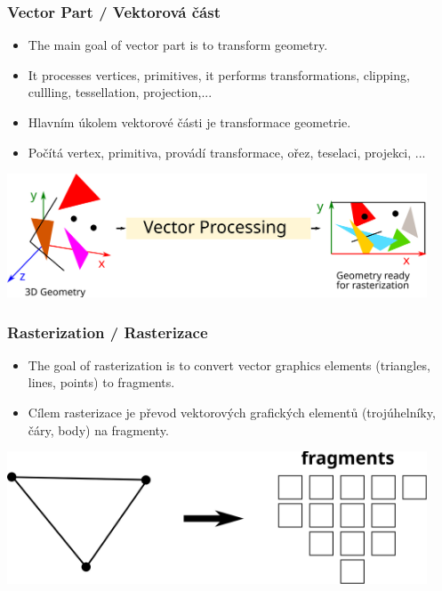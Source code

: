 \begin{frame}
\frametitle{Vector Part / Vektorová část}
  \scriptsize
	\begin{itemize}
		\item The main goal of vector part is to transform geometry.
    \item It processes vertices, primitives, it performs transformations, clipping, cullling, tessellation, projection,...
	\end{itemize}

	\begin{itemize}
		\item Hlavním úkolem vektorové části je transformace geometrie.
    \item Počítá vertex, primitiva, provádí transformace, ořez, teselaci, projekci, ...
	\end{itemize}

	\includegraphics[width=12.5cm,keepaspectratio]{pics/pipeline/pipeline_vector_overview}
\end{frame}

\begin{frame}
\frametitle{Rasterization / Rasterizace}
  \scriptsize
	\begin{itemize}
    \item The goal of rasterization is to convert vector graphics elements (triangles, lines, points) to fragments.
	\end{itemize}

	\begin{itemize}
    \item Cílem rasterizace je převod vektorových grafických elementů (trojúhelníky, čáry, body) na fragmenty.
  \end{itemize}
	\includegraphics[width=12.5cm,keepaspectratio]{pics/pipeline/rasterization_overview}
\end{frame}

